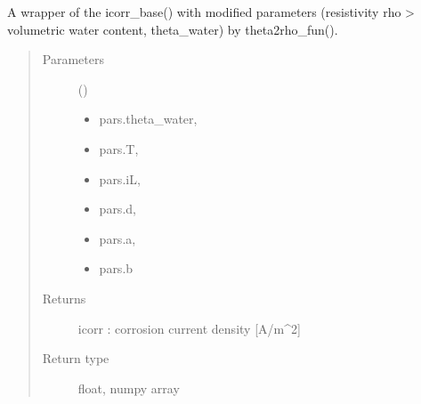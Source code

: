 \documentclass[letterpaper,10pt,english]{sphinxmanual}
\begin{document}
\begin{fulllineitems}
\label{\detokenize{corrosion:corrosion.icorr_f}}
\sphinxAtStartPar
A wrapper of the icorr\_base() with modified parameters (resistivity rho \sphinxhyphen{}\textgreater{} volumetric water content, theta\_water)
by theta2rho\_fun().
\begin{quote}\begin{description}
\item[{Parameters}] \leavevmode
\sphinxAtStartPar
{} () \textendash{} \begin{itemize}
\item {} 
\sphinxAtStartPar
pars.theta\_water,

\item {} 
\sphinxAtStartPar
pars.T,

\item {} 
\sphinxAtStartPar
pars.iL,

\item {} 
\sphinxAtStartPar
pars.d,

\item {} 
\sphinxAtStartPar
pars.a,

\item {} 
\sphinxAtStartPar
pars.b

\end{itemize}


\item[{Returns}] \leavevmode
\sphinxAtStartPar
icorr : corrosion current density {[}A/m\textasciicircum{}2{]}

\item[{Return type}] \leavevmode
\sphinxAtStartPar
float, numpy array

\end{description}\end{quote}

\end{fulllineitems}

\end{document}
